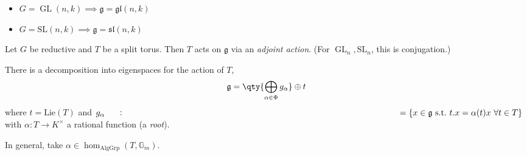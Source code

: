 \begin{example}

\begin{example}

\hfill

\begin{itemize}
\tightlist
\item
  \(G = \operatorname{GL}(n, k) \implies{\mathfrak{g}}= {\mathfrak{gl}}(n, k)\)
\item
  \(G = {\text{SL}}(n, k) \implies{\mathfrak{g}}= {\mathfrak{sl}}(n, k)\)
\end{itemize}

\end{example}

\end{example}

Let \(G\) be reductive and \(T\) be a split torus. Then \(T\) acts on
\({\mathfrak{g}}\) via an \emph{adjoint action}. (For
\(\operatorname{GL}_n, {\text{SL}}_n\), this is conjugation.)

There is a decomposition into eigenspaces for the action of \(T\),
\begin{align*}   {\mathfrak{g}}= \qty{\bigoplus_{\alpha\in \Phi} g_\alpha} \oplus t \end{align*}
where \(t = \mathrm{Lie}(T)\) and
\(g_\alpha \mathrel{\vcenter{:}}=\left\{{x\in {\mathfrak{g}}~{\text{s.t.}}~t.x = \alpha(t) x\,\, \forall t\in T}\right\}\)
with \(\alpha: T\to K^{\times}\) a rational function (a \emph{root}).

In general, take \(\alpha\in\hom_{\text{AlgGrp}}(T, {\mathbb{G}}_m)\).

